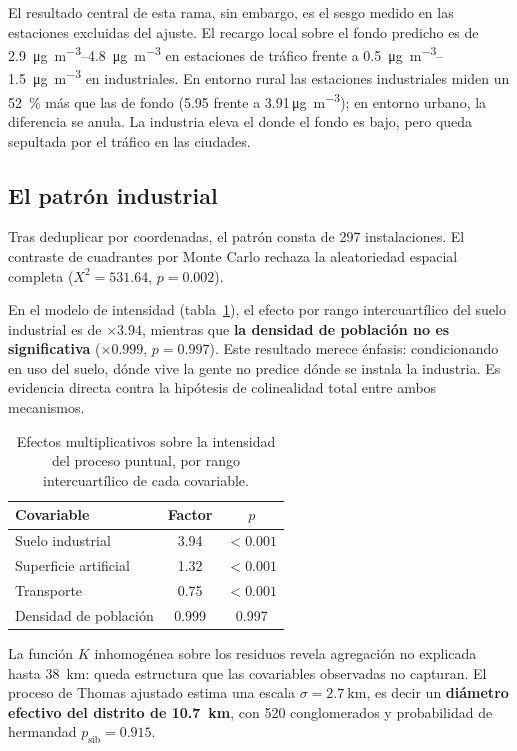 \documentclass[10pt,twocolumn,a4paper]{article}
\newcommand{\ugm}{\si{\micro\gram\per\cubic\metre}}
\begin{document}
El resultado central de esta rama, sin embargo, es el sesgo medido en las
estaciones excluidas del ajuste. El recargo local sobre el fondo predicho es
de \SIrange{2.9}{4.8}{\ugm} en estaciones de tráfico frente a
\SIrange{0.5}{1.5}{\ugm} en industriales. En entorno rural las estaciones
industriales miden un \SI{52}{\percent} más que las de fondo (\num{5.95}
frente a \num{3.91}\,\ugm); en entorno urbano, la diferencia se anula. La
industria eleva el  donde el fondo es bajo, pero queda sepultada por
el tráfico en las ciudades.

\subsection{El patrón industrial}

Tras deduplicar por coordenadas, el patrón consta de \num{297} instalaciones.
El contraste de cuadrantes por Monte Carlo rechaza la aleatoriedad espacial
completa ($X^2 = \num{531.64}$, $p = \num{0.002}$).

En el modelo de intensidad (tabla~\ref{tab:ppm}), el efecto por rango
intercuartílico del suelo industrial es de $\times\num{3.94}$, mientras que
\textbf{la densidad de población no es significativa}
($\times\num{0.999}$, $p = \num{0.997}$). Este resultado merece énfasis:
condicionando en uso del suelo, dónde vive la gente no predice dónde se
instala la industria. Es evidencia directa contra la hipótesis de
colinealidad total entre ambos mecanismos.

\begin{table}[t]
\centering
\caption{Efectos multiplicativos sobre la intensidad del proceso puntual, por
rango intercuartílico de cada covariable.}
\label{tab:ppm}
\small
\begin{tabular}{@{}lcc@{}}
\toprule
\textbf{Covariable} & \textbf{Factor} & \textbf{$p$} \\
\midrule
Suelo industrial       & \num{3.94} & $<\num{0.001}$ \\
Superficie artificial  & \num{1.32} & $<\num{0.001}$ \\
Transporte             & \num{0.75} & $<\num{0.001}$ \\
Densidad de población  & \num{0.999} & \num{0.997} \\
\bottomrule
\end{tabular}
\end{table}

La función $K$ inhomogénea sobre los residuos revela agregación no explicada
hasta \SI{38}{\kilo\metre}: queda estructura que las covariables observadas no
capturan. El proceso de Thomas ajustado estima una escala
$\sigma = \SI{2.7}{\kilo\metre}$, es decir un \textbf{diámetro efectivo del
distrito de \SI{10.7}{\kilo\metre}}, con \num{520} conglomerados y
probabilidad de hermandad $p_{\text{sib}} = \num{0.915}$.
\end{document}
